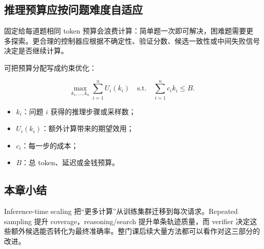 \subsection{推理预算应按问题难度自适应}

固定给每道题相同 token 预算会浪费计算：简单题一次即可解决，困难题需要更多探索。更合理的控制器应根据不确定性、验证分数、候选一致性或中间失败信号决定是否继续计算。

可把预算分配写成约束优化：

$$
\max_{k_1,\ldots,k_n}\sum_{i=1}^{n} U_i(k_i)
\quad\text{s.t.}\quad
\sum_{i=1}^{n} c_i k_i\le B.
$$

\begin{itemize}
    \item $k_i$：问题 $i$ 获得的推理步骤或采样数；
    \item $U_i(k_i)$：额外计算带来的期望效用；
    \item $c_i$：每一步的成本；
    \item $B$：总 token、延迟或金钱预算。
\end{itemize}

\subsection{本章小结}

Inference-time scaling 把“更多计算”从训练集群迁移到每次请求。Repeated sampling 提升 coverage，reasoning/search 提升单条轨迹质量，而 verifier 决定这些额外候选能否转化为最终准确率。整门课后续大量方法都可以看作对这三部分的改进。

